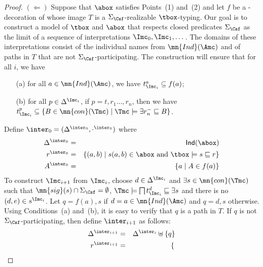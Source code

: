 \documentclass{lmcs}
\theoremstyle{definition}
\begin{document}
\begin{proof}
  $(\Leftarrow)$ Suppose that $\abox$ satisfies Points~(1) and~(2)
  and let $f$ be a \Tmc-decoration of \Amc whose image $T$ is a $\Sigma_{\Csf}$-realizable $\tbox$-typing. 
  Our goal is to construct a model \Imc of $\tbox$ and $\abox$ that respects closed
  predicates $\Sigma_{\Csf}$ as the limit of a sequence of interpretations
  $\Imc_0,\Imc_1,\dots$. The domains of these interpretations consist
  of the individual names from $\mn{Ind}(\Amc)$ and of paths in $T$ that
  are not $\Sigma_{\Csf}$-participating. The construction will ensure that
  for all $i$, we have
  \begin{enumerate}

  \item[(a)] for all $a \in \mn{Ind}(\Amc)$, we have $t^a_{\Imc_i}
    \subseteq f(a)$;

  \item[(b)] for all $p \in \Delta^{\Imc_{i}}$, if $p=t,r_1 \dots, r_n$, then we have
    $t^p_{\Imc_i} \subseteq \{ B \in \mn{con}(\Tmc) \mid \Tmc \models
    \exists r_n^- \sqsubseteq B \}$.

    \end{enumerate}
    Define $\inter_0=(\Delta^{\inter_0},\cdot^{\inter_0})$ where
    \begin{eqnarray*}
      \Delta^{\inter_0} & = & \mathsf{Ind}(\abox)\\
      r^{\inter_0} & = & \{(a,b)\mid s(a,b)\in\abox\text{ and
      }\tbox\models s\sqsubseteq r\} \\ %
      A^{\inter_0} & = & \{a\mid A\in f(a)\} %
    \end{eqnarray*}
    To construct $\Imc_{i+1}$ from
    $\Imc_i$, %
    choose $d \in \Delta^{\Imc_i}$ and $\exists s \in \mn{con}(\Tmc)$
    such that $\mn{sig}(s) \cap \Sigma_{\Csf} = \emptyset$, $\Tmc \models
    \bigsqcap t^d_{\Imc_i} \sqsubseteq \exists s$ and there is no
    $(d,e) \in s^{\Imc_i}$. Let $q=f(a),s$ if $d=a \in \mn{Ind}(\Amc)$
    and $q=d,s$ otherwise. Using Conditions~(a) and~(b), it is easy to
    verify that $q$ is a path in $T$. If $q$ is not
    $\Sigma_{\Csf}$-participating, then define $\inter_{i+1}$ as follows:
    \begin{eqnarray*}
      \Delta^{\inter_{i+1}} & = & \Delta^{\inter_i}\uplus\{q\}\\
      r^{\inter_{i+1}} & = & \begin{cases}


\end{cases}
\end{eqnarray*}
\end{proof}
\end{document}
